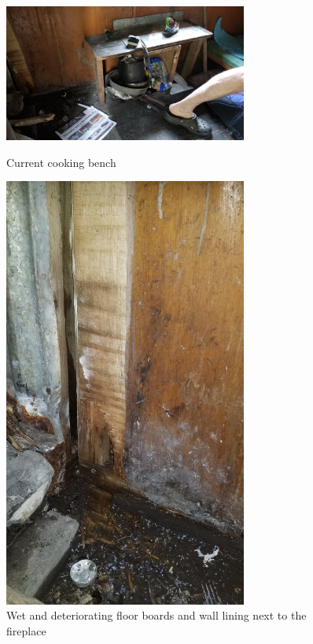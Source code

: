\documentclass[12pt]{article} %
\begin{document}
\begin{figure}[ht]
\begin{minipage}{.5\linewidth}
\begin{flushleft}
   \includegraphics[width=8cm]{LucretiaBivReport23Nov2019Photo6}
   \caption{Current cooking bench}
   \label{LB06}
\end{flushleft}
\end{minipage}
\begin{minipage}{.5\linewidth}
\begin{center}
   \includegraphics[width=8cm, angle=270]{LucretiaBivReport23Nov2019Photo5}
   \caption{Wet and deteriorating floor boards and wall lining next to the fireplace}
   \label{LB05}
\end{center}
\end{minipage}
\end{figure}
\end{document}
